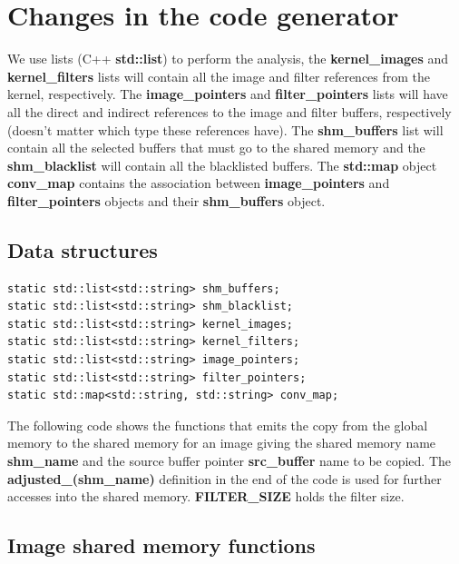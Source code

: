 \documentclass{article}
\begin{document}
\section{Changes in the code generator}

We use lists (C++ \textbf{std::list}) to perform the analysis, the \textbf{kernel\_images} and \textbf{kernel\_filters} lists will contain all the image and filter references from the kernel, respectively. The \textbf{image\_pointers} and \textbf{filter\_pointers} lists will have all the direct and indirect references to the image and filter buffers, respectively (doesn't matter which type these references have). The \textbf{shm\_buffers} list will contain all the selected buffers that must go to the shared memory and the \textbf{shm\_blacklist} will contain all the blacklisted buffers. The \textbf{std::map} object \textbf{conv\_map} contains the association between \textbf{image\_pointers} and \textbf{filter\_pointers} objects and their \textbf{shm\_buffers} object.

\subsection{Data structures}

\begin{verbatim}
static std::list<std::string> shm_buffers;
static std::list<std::string> shm_blacklist;
static std::list<std::string> kernel_images;
static std::list<std::string> kernel_filters;
static std::list<std::string> image_pointers;
static std::list<std::string> filter_pointers;
static std::map<std::string, std::string> conv_map;
\end{verbatim}

The following code shows the functions that emits the copy from the global memory to the shared memory for an image giving the shared memory name \textbf{shm\_name} and the source buffer pointer \textbf{src\_buffer} name to be copied. The \textbf{adjusted\_(shm\_name)} definition in the end of the code is used for further accesses into the shared memory. \textbf{FILTER\_SIZE} holds the filter size.

\pagebreak

\subsection{Image shared memory functions}
\end{document}
